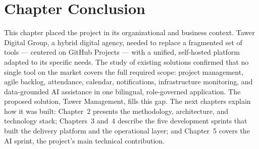 \section{Chapter Conclusion}

This chapter placed the project in its organizational and business context. Tawer Digital
Group, a hybrid digital agency, needed to replace a fragmented set of tools --- centered on
GitHub Projects --- with a unified, self-hosted platform adapted to its specific needs. The
study of existing solutions confirmed that no single tool on the market covers the full
required scope: project management, agile backlog, attendance, calendar, notifications,
infrastructure monitoring, and data-grounded AI assistance in one bilingual, role-governed
application. The proposed solution, Tawer Management, fills this gap. The next chapters explain
how it was built: Chapter~2 presents the methodology, architecture, and technology stack;
Chapters~3 and~4 describe the five development sprints that built the delivery platform and the
operational layer; and Chapter~5 covers the AI sprint, the project's main technical
contribution.
